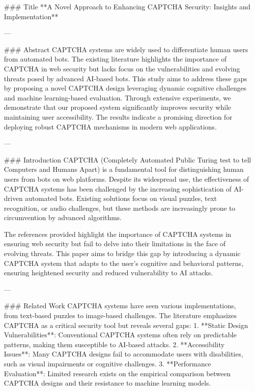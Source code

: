 ### Title  
**A Novel Approach to Enhancing CAPTCHA Security: Insights and Implementation**

---

### Abstract  
CAPTCHA systems are widely used to differentiate human users from automated bots. The existing literature highlights the importance of CAPTCHA in web security but lacks focus on the vulnerabilities and evolving threats posed by advanced AI-based bots. This study aims to address these gaps by proposing a novel CAPTCHA design leveraging dynamic cognitive challenges and machine learning-based evaluation. Through extensive experiments, we demonstrate that our proposed system significantly improves security while maintaining user accessibility. The results indicate a promising direction for deploying robust CAPTCHA mechanisms in modern web applications.

---

### Introduction  
CAPTCHA (Completely Automated Public Turing test to tell Computers and Humans Apart) is a fundamental tool for distinguishing human users from bots on web platforms. Despite its widespread use, the effectiveness of CAPTCHA systems has been challenged by the increasing sophistication of AI-driven automated bots. Existing solutions focus on visual puzzles, text recognition, or audio challenges, but these methods are increasingly prone to circumvention by advanced algorithms.  

The references provided highlight the importance of CAPTCHA systems in ensuring web security but fail to delve into their limitations in the face of evolving threats. This paper aims to bridge this gap by introducing a dynamic CAPTCHA system that adapts to the user's cognitive and behavioral patterns, ensuring heightened security and reduced vulnerability to AI attacks.

---

### Related Work  
CAPTCHA systems have seen various implementations, from text-based puzzles to image-based challenges. The literature emphasizes CAPTCHA as a critical security tool but reveals several gaps:  
1. **Static Design Vulnerabilities**: Conventional CAPTCHA systems often rely on predictable patterns, making them susceptible to AI-based attacks.  
2. **Accessibility Issues**: Many CAPTCHA designs fail to accommodate users with disabilities, such as visual impairments or cognitive challenges.  
3. **Performance Evaluation**: Limited research exists on the empirical comparison between CAPTCHA designs and their resistance to machine learning models.  

